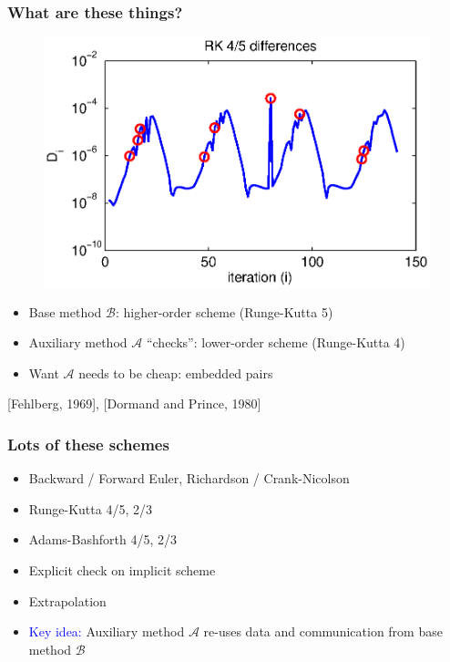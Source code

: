 \documentclass{beamer}
\newcommand{\A}{\mathcal{A}}
\newcommand{\B}{\mathcal{B}}
\begin{document}
%
\begin{frame}
\frametitle{What are these things?}

\begin{figure}
  \centering
  \includegraphics[scale=0.5]{figs/vdp2_rk.eps}
\end{figure}

\begin{itemize}
\setlength{\itemsep}{0.05in}
\item{Base method $\B$: higher-order scheme (Runge-Kutta 5)}
\pause
\item{Auxiliary method $\A$ ``checks'': lower-order scheme (Runge-Kutta 4)}
\pause
\item{Want $\A$ needs to be cheap: embedded pairs}
\end{itemize}

[Fehlberg, 1969],
[Dormand and Prince, 1980]

\end{frame}



%
\begin{frame}
\frametitle{Lots of these schemes}

\begin{itemize}
\item Backward / Forward Euler, Richardson / Crank-Nicolson
\item Runge-Kutta 4/5, 2/3
\item Adams-Bashforth 4/5, 2/3
\item Explicit check on implicit scheme
\item Extrapolation
\end{itemize}

\pause
\begin{itemize}
\item \textcolor{blue}{Key idea:}  Auxiliary method $\A$ re-uses data and communication from base method $\B$
\end{itemize}

\end{frame}
\end{document}
